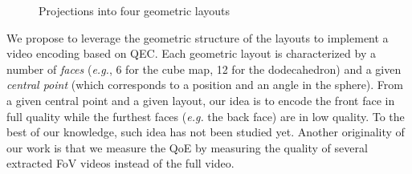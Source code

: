 \begin{figure}[t]
\centering
{}
\caption{Projections into four geometric layouts}\label{fig:mapping}
\end{figure}

We propose to leverage the geometric structure of the layouts
to implement a video encoding based on \ac{QEC}. Each geometric layout is characterized 
by a number of \emph{faces} (\textit{e.g.}, 6 for 
the cube map, 12 for the dodecahedron) and a given \emph{central point} (which corresponds
to a position and an angle in the sphere).
From a given central point and a given layout, our idea is to encode the front face in full 
quality while the furthest faces (\textit{e.g.} the back face) are in low quality.
To the best of our knowledge, such idea has not been studied yet. Another originality of
our work is that we measure the \ac{QoE} by measuring the quality of several extracted
\ac{FoV} 
videos instead
of the full video.


